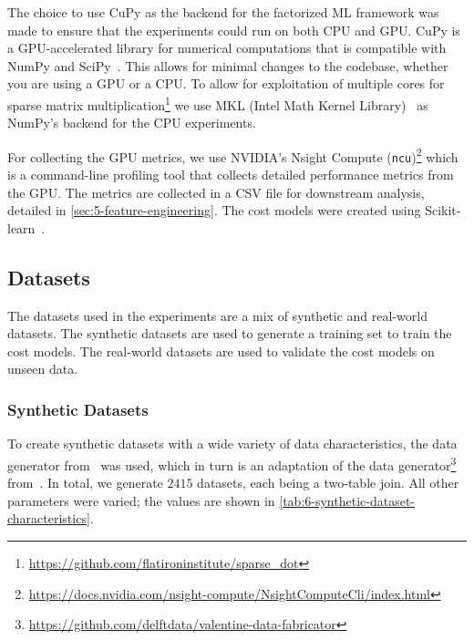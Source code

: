 The choice to use CuPy as the backend for the factorized ML framework was made to ensure that the experiments could run on both CPU and GPU. CuPy is a GPU-accelerated library for numerical computations that is compatible with NumPy and SciPy~\cite{cupy_learningsys2017}. This allows for minimal changes to the codebase, whether you are using a GPU or a CPU. To allow for exploitation of multiple cores for sparse matrix multiplication\footnote{\url{https://github.com/flatironinstitute/sparse_dot}} we use MKL (Intel Math Kernel Library)~\cite{intel-mkl} as NumPy's backend for the CPU experiments.

For collecting the GPU metrics, we use NVIDIA's Nsight Compute (\texttt{ncu})\footnote{\url{https://docs.nvidia.com/nsight-compute/NsightComputeCli/index.html}} which is a command-line profiling tool that collects detailed performance metrics from the GPU. The metrics are collected in a CSV file for downstream analysis, detailed in \autoref{sec:5-feature-engineering}. The cost models were created using Scikit-learn~\cite{scikit-learn}.

\subsection{Datasets}
\label{subsec:6-datasets}
The datasets used in the experiments are a mix of synthetic and real-world datasets. The synthetic datasets are used to generate a training set to train the cost models. The real-world datasets are used to validate the cost models on unseen data.

\subsubsection{Synthetic Datasets}
To create synthetic datasets with a wide variety of data characteristics, the data generator from~\cite{amalur_tkde24} was used, which in turn is an adaptation of the data generator\footnote{\url{https://github.com/delftdata/valentine-data-fabricator}} from~\cite{valentine-data-generator}. In total, we generate $2415$ datasets, each being a two-table join. All other parameters were varied; the values are shown in \autoref{tab:6-synthetic-dataset-characteristics}.


